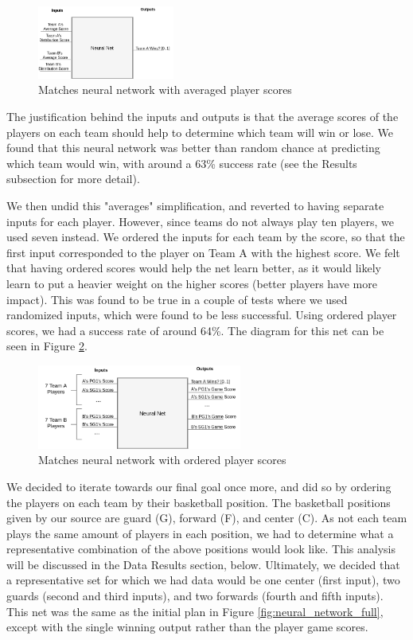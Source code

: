 \begin{figure}[ht]
    \centering
    \includegraphics[width=0.4\textwidth]{figures/neural_network_averages}
    \caption{Matches neural network with averaged player scores}
    \label{fig:neural_network_averages}
\end{figure}

The justification behind the inputs and outputs is that the average scores of the players on each team should help to determine which team will win or lose. We found that this neural network was better than random chance at predicting which team would win, with around a 63\% success rate (see the Results subsection for more detail).

We then undid this "averages" simplification, and reverted to having separate inputs for each player. However, since teams do not always play ten players, we used seven instead. We ordered the inputs for each team by the score, so that the first input corresponded to the player on Team A with the highest score. We felt that having ordered scores would help the net learn better, as it would likely learn to put a heavier weight on the higher scores (better players have more impact). This was found to be true in a couple of tests where we used randomized inputs, which were found to be less successful. Using ordered player scores, we had a success rate of around 64\%. The diagram for this net can be seen in Figure \ref{fig:neural_network_ordered}.

\begin{figure}[ht]
    \centering
    \includegraphics[width=0.6\textwidth]{figures/neural_network_ordered}
    \caption{Matches neural network with ordered player scores}
    \label{fig:neural_network_ordered}
\end{figure}

We decided to iterate towards our final goal once more, and did so by ordering the players on each team by their basketball position. The basketball positions given by our source are guard (G), forward (F), and center (C). As not each team plays the same amount of players in each position, we had to determine what a representative combination of the above positions would look like. This analysis will be discussed in the Data Results section, below. Ultimately, we decided that a representative set for which we had data would be one center (first input), two guards (second and third inputs), and two forwards (fourth and fifth inputs). This net was the same as the initial plan in Figure \ref{fig:neural_network_full}, except with the single winning output rather than the player game scores.

